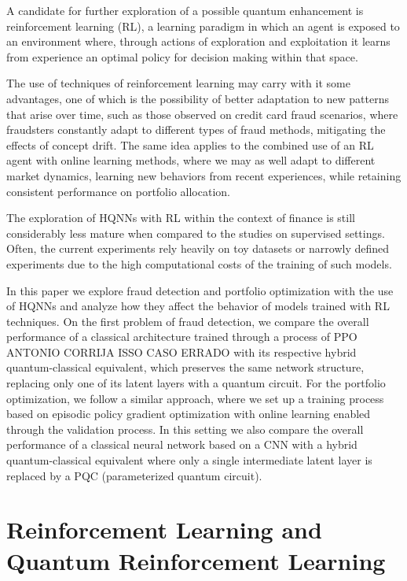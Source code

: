 A candidate for further exploration of a possible quantum enhancement is reinforcement learning (RL), a learning paradigm in which an agent is exposed to an environment where, through actions of exploration and exploitation it learns from experience an optimal policy for decision making within that space. 

The use of techniques of reinforcement learning may carry with it some advantages, one of which is the possibility of better adaptation to new patterns that arise over time, such as those observed on credit card fraud scenarios, where fraudsters constantly adapt to different types of fraud methods, mitigating the effects of concept drift. The same idea applies to the combined use of an RL agent with online learning methods, where we may as well adapt to different market dynamics, learning new behaviors from recent experiences, while retaining consistent performance on portfolio allocation.

The exploration of HQNNs with RL within the context of finance is still considerably less mature when compared to the studies on supervised settings. Often, the current experiments rely heavily on toy datasets or narrowly defined experiments due to the high computational costs of the training of such models.

In this paper we explore fraud detection and portfolio optimization with the use of HQNNs and analyze how they affect the behavior of models trained with RL techniques. On the first problem of fraud detection, we compare the overall performance of a classical architecture trained through a process of PPO ANTONIO CORRIJA ISSO CASO ERRADO with its respective hybrid quantum-classical equivalent, which preserves the same network structure, replacing only one of its latent layers with a quantum circuit. For the portfolio optimization, we follow a similar approach, where we set up a training process based on episodic policy gradient optimization with online learning enabled through the validation process. In this setting we also compare the overall performance of a classical neural network based on a CNN with a hybrid quantum-classical equivalent where only a single intermediate latent layer is replaced by a PQC (parameterized quantum circuit).

\section{Reinforcement Learning and Quantum Reinforcement Learning}




